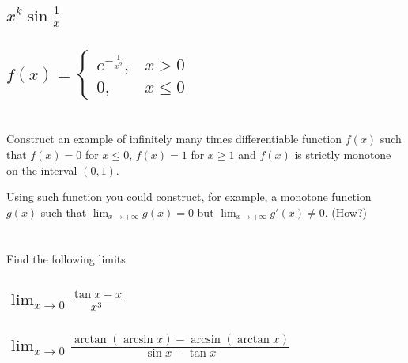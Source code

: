 \documentclass[]{article}
\begin{document}
\subsection{
    $x^k \sin{\frac{1}{x}}$
}





\subsection{
    $f(x) =
    \begin{cases}
        e^{-\frac{1}{x^2}}, &x > 0\\
        0,                  &x \leq 0
    \end{cases}$
}




\newpage
\section{}
Construct an example of infinitely many times differentiable function $f(x)$ such that $f(x) = 0$ for $x \leq 0$, $f(x) = 1$ for $x \geq 1$ and $f(x)$ is strictly monotone on the interval $(0,1)$.

Using such function you could construct, for example, a monotone function $g(x)$ such that $\lim_{x \to +\infty} g(x) = 0$ but $\lim_{x \to +\infty} g'(x) \neq 0$. (How?)




















\newpage
\section{}
Find the following limits

\subsection{
    $\lim_{x \to 0} \frac{\tan{x} - x}{x^3}$
}









\subsection{
    $\lim_{x \to 0} \frac{\arctan(\arcsin{x}) - \arcsin(\arctan{x})}{\sin{x} - \tan{x}}$
}
\end{document}
